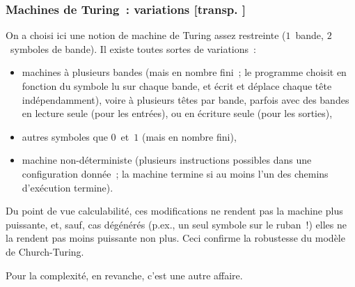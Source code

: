\documentclass[mathserif,a4paper,aspectratio=169]{beamer}
\renewcommand{\frametitle}[1]{\subsubsection*{#1 {\footnotesize[transp. \insertframenumber]}}}
\begin{document}
\begin{frame}
\frametitle{Machines de Turing : variations}

On a choisi ici une notion de machine de Turing assez restreinte
($1$ bande, $2$ symboles de bande).  Il existe toutes sortes de
variations :
\begin{itemize}
\item machines à plusieurs bandes (mais en nombre fini ; le programme
  choisit en fonction du symbole lu sur chaque bande, et écrit et
  déplace chaque tête indépendamment), voire à plusieurs têtes par
  bande, parfois avec des bandes en lecture seule (pour les entrées),
  ou en écriture seule (pour les sorties),
\item autres symboles que $0$ et $1$ (mais en nombre fini),
\item machine non-déterministe (plusieurs instructions possibles dans
  une configuration donnée ; la machine termine si au moins l'un des
  chemins d'exécution termine).
\end{itemize}

\bigskip

Du point de vue \alert{calculabilité}, ces modifications ne rendent
pas la machine plus puissante, et, sauf, cas dégénérés (p.ex., un seul
symbole sur le ruban !) elles ne la rendent pas moins puissante non
plus.  Ceci confirme la robustesse du modèle de Church-Turing.

\smallskip

{\footnotesize Pour la \alert{complexité}, en revanche, c'est une
  autre affaire.\par}

\end{frame}
%
\end{document}
